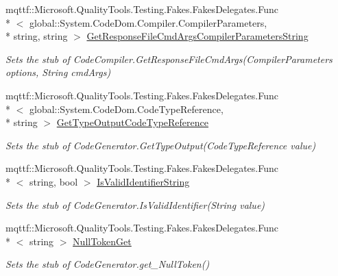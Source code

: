 \begin{DoxyCompactItemize}
mqttf\-::\-Microsoft.\-Quality\-Tools.\-Testing.\-Fakes.\-Fakes\-Delegates.\-Func\\*
$<$ global\-::\-System.\-Code\-Dom.\-Compiler.\-Compiler\-Parameters, \\*
string, string $>$ \hyperlink{class_system_1_1_code_dom_1_1_compiler_1_1_fakes_1_1_stub_code_compiler_acdd63e0e4f92eedb32fae2a6f2c2aa21}{Get\-Response\-File\-Cmd\-Args\-Compiler\-Parameters\-String}
\begin{DoxyCompactList}\small\item\em Sets the stub of Code\-Compiler.\-Get\-Response\-File\-Cmd\-Args(\-Compiler\-Parameters options, String cmd\-Args)\end{DoxyCompactList}\item 
mqttf\-::\-Microsoft.\-Quality\-Tools.\-Testing.\-Fakes.\-Fakes\-Delegates.\-Func\\*
$<$ global\-::\-System.\-Code\-Dom.\-Code\-Type\-Reference, \\*
string $>$ \hyperlink{class_system_1_1_code_dom_1_1_compiler_1_1_fakes_1_1_stub_code_compiler_a1948984e146ce99d12aa02b6eefa8428}{Get\-Type\-Output\-Code\-Type\-Reference}
\begin{DoxyCompactList}\small\item\em Sets the stub of Code\-Generator.\-Get\-Type\-Output(\-Code\-Type\-Reference value)\end{DoxyCompactList}\item 
mqttf\-::\-Microsoft.\-Quality\-Tools.\-Testing.\-Fakes.\-Fakes\-Delegates.\-Func\\*
$<$ string, bool $>$ \hyperlink{class_system_1_1_code_dom_1_1_compiler_1_1_fakes_1_1_stub_code_compiler_a3170668c0bf31bb49f09beea0757a70f}{Is\-Valid\-Identifier\-String}
\begin{DoxyCompactList}\small\item\em Sets the stub of Code\-Generator.\-Is\-Valid\-Identifier(\-String value)\end{DoxyCompactList}\item 
mqttf\-::\-Microsoft.\-Quality\-Tools.\-Testing.\-Fakes.\-Fakes\-Delegates.\-Func\\*
$<$ string $>$ \hyperlink{class_system_1_1_code_dom_1_1_compiler_1_1_fakes_1_1_stub_code_compiler_aa6593c24b2f44746a2d48e8e5fa4b0c0}{Null\-Token\-Get}
\begin{DoxyCompactList}\small\item\em Sets the stub of Code\-Generator.\-get\-\_\-\-Null\-Token()\end{DoxyCompactList}\item 

\end{DoxyCompactItemize}
